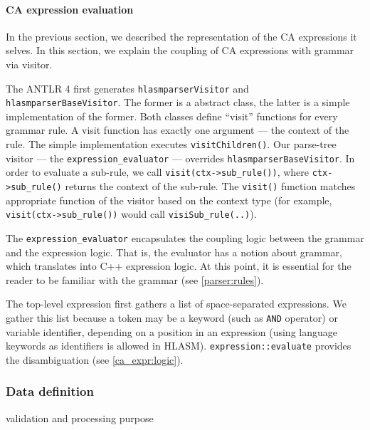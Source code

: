 \paragraph{CA expression evaluation}
\label{ca_expr:eval}

In the previous section, we described the representation of the CA expressions it selves. In this section, we explain the coupling of CA expressions with grammar via visitor. 

The ANTLR 4 first generates \texttt{hlasmparserVisitor} and \texttt{hlasmparserBaseVisitor}. The former is a abstract class, the latter is a simple implementation of the former. Both classes define ``visit'' functions for every grammar rule. A visit function has exactly one argument --- the context of the rule. The simple implementation executes \texttt{visitChildren()}. Our parse-tree visitor --- the \texttt{expression\_evaluator} --- overrides \texttt{hlasmparserBaseVisitor}. In order to evaluate a sub-rule, we call \texttt{visit(ctx->sub\_rule())}, where \texttt{ctx->sub\_rule()} returns the context of the sub-rule. The \texttt{visit()} function matches appropriate function of the visitor based on the context type (for example, \texttt{visit(ctx->sub\_rule())} would call \texttt{visiSub\_rule(..)}).

The \texttt{expression\_evaluator} encapsulates the coupling logic between the grammar and the expression logic. That is, the evaluator has a notion about grammar, which translates into C++ expression logic. At this point, it is essential for the reader to be familiar with the grammar (see \cref{parser:rules}).

The top-level expression first gathers a list of space-separated expressions. We gather this list because a token may be a keyword (such as \texttt{AND} operator) or variable identifier, depending on a position in an expression (using language keywords as identifiers is allowed in HLASM). \texttt{expression::evaluate} provides the disambiguation (see \cref{ca_expr:logic}). 


\subsubsection{Data definition}

validation and processing purpose